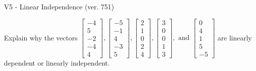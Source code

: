 \begin{exercise}
  \begin{exerciseTitle}V5 - Linear Independence (ver. 751)\end{exerciseTitle}
  \begin{exerciseStatement}
    Explain why the vectors \(\left[\begin{array}{r}
-4 \\
5 \\
-2 \\
-4 \\
4
\end{array}\right] , \left[\begin{array}{r}
-5 \\
-1 \\
4 \\
-3 \\
5
\end{array}\right] , \left[\begin{array}{r}
2 \\
1 \\
0 \\
2 \\
4
\end{array}\right] , \left[\begin{array}{r}
3 \\
0 \\
0 \\
1 \\
3
\end{array}\right] , \text{ and } \left[\begin{array}{r}
0 \\
4 \\
1 \\
5 \\
-5
\end{array}\right]\) are linearly dependent or linearly independent.	



\end{exerciseStatement}
\end{exercise}

